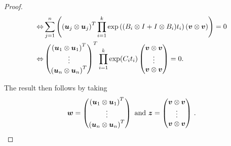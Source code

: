 \begin{proof}
\begin{align*}
\Leftrightarrow &\sum \limits_{j=1}^{n} \left( \left( \boldsymbol{u}_{j} \otimes \boldsymbol{u}_{j} \right)^{T} \prod \limits_{i=1}^{k} \exp\left((B_{i} \otimes I + I \otimes B_{i}) t_{i} \right) \left( \boldsymbol{v} \otimes \boldsymbol{v} \right) \right) = 0 \\
\Leftrightarrow &\begin{pmatrix} \left(\boldsymbol{u}_{1} \otimes \boldsymbol{u}_{1}\right)^{T} \\ \vdots \\ \left(\boldsymbol{u}_{n} \otimes \boldsymbol{u}_{n}\right)^{T} \end{pmatrix}^{T} \prod \limits_{i=1}^{k} \exp( C_{i} t_{i} ) \begin{pmatrix} \boldsymbol{v} \otimes \boldsymbol{v} \\ \vdots \\ \boldsymbol{v} \otimes \boldsymbol{v} \end{pmatrix} = 0 .
\end{align*}

The result then follows by taking
\begin{equation*}
  \boldsymbol{w} = \begin{pmatrix} \left(\boldsymbol{u}_{1} \otimes \boldsymbol{u}_{1}\right)^{T} \\ \vdots \\ \left(\boldsymbol{u}_{n} \otimes \boldsymbol{u}_{n}\right)^{T} \end{pmatrix}
  \mbox{ and } \boldsymbol{z} = \begin{pmatrix} \boldsymbol{v} \otimes \boldsymbol{v} \\ \vdots \\ \boldsymbol{v} \otimes \boldsymbol{v} \end{pmatrix} \, .
\end{equation*}
\end{proof}
